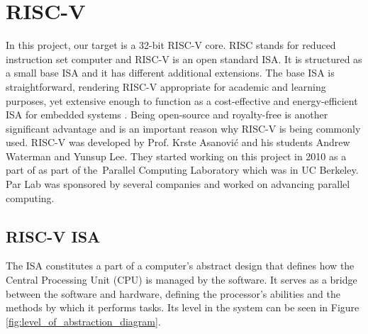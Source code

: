 \clearpage
\chapter{RISC-V}\label{ch:riscv}
In this project, our target is a 32-bit RISC-V core. RISC stands for reduced instruction set computer and RISC-V is an open standard ISA. \cite{riscvorgabout} It is structured as a small base ISA and it has different additional extensions. The base ISA is straightforward, rendering RISC-V appropriate for academic and learning purposes, yet extensive enough to function as a cost-effective and energy-efficient ISA for embedded systems \cite{watermanriscv}. Being open-source and royalty-free is another significant advantage and is an important reason why RISC-V is being commonly used. 
RISC-V was developed by Prof. Krste Asanović and his students Andrew Waterman and Yunsup Lee. They started working on this project in 2010 as a part of as part of the Parallel Computing Laboratory which was in UC Berkeley. Par Lab was sponsored by several companies and worked on advancing parallel computing.

\section{RISC-V ISA}
The ISA constitutes a part of a computer’s abstract design that defines how the Central Processing Unit (CPU) is managed by the software. It serves as a bridge between the software and hardware, defining the processor’s abilities and the methods by which it performs tasks. Its level in the system can be seen in Figure \ref{fig:level_of_abstraction_diagram}.

